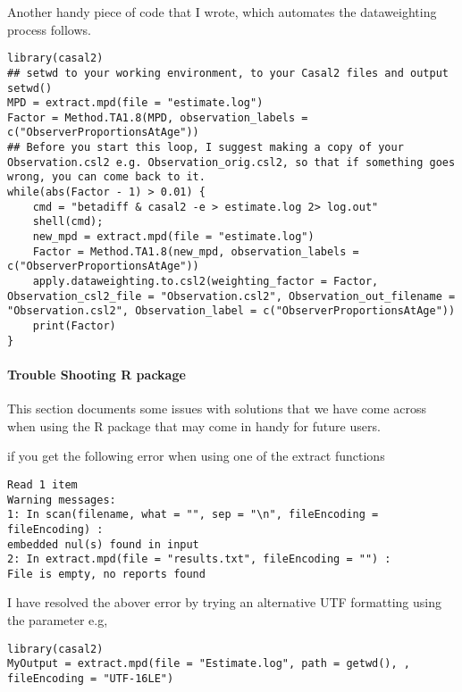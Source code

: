 Another handy piece of code that I wrote, which automates the dataweighting process follows.

\begin{lstlisting}
library(casal2)
## setwd to your working environment, to your Casal2 files and output
setwd()
MPD = extract.mpd(file = "estimate.log")
Factor = Method.TA1.8(MPD, observation_labels = c("ObserverProportionsAtAge"))
## Before you start this loop, I suggest making a copy of your Observation.csl2 e.g. Observation_orig.csl2, so that if something goes wrong, you can come back to it.
while(abs(Factor - 1) > 0.01) {
	cmd = "betadiff & casal2 -e > estimate.log 2> log.out"
	shell(cmd);
	new_mpd = extract.mpd(file = "estimate.log")
	Factor = Method.TA1.8(new_mpd, observation_labels = c("ObserverProportionsAtAge"))
	apply.dataweighting.to.csl2(weighting_factor = Factor, Observation_csl2_file = "Observation.csl2", Observation_out_filename = "Observation.csl2", Observation_label = c("ObserverProportionsAtAge"))
	print(Factor)
}
\end{lstlisting}
\paragraph*{Trouble Shooting R package}
This section documents some issues with solutions that we have come across when using the R package that may come in handy for future users.

if you get the following error when using one of the extract functions 
\begin{lstlisting}
Read 1 item
Warning messages:
1: In scan(filename, what = "", sep = "\n", fileEncoding = fileEncoding) :
embedded nul(s) found in input
2: In extract.mpd(file = "results.txt", fileEncoding = "") :
File is empty, no reports found
\end{lstlisting}

I have resolved the abover error by trying an alternative UTF formatting using the  parameter e.g,
\begin{lstlisting}
library(casal2)
MyOutput = extract.mpd(file = "Estimate.log", path = getwd(), , fileEncoding = "UTF-16LE")
\end{lstlisting}